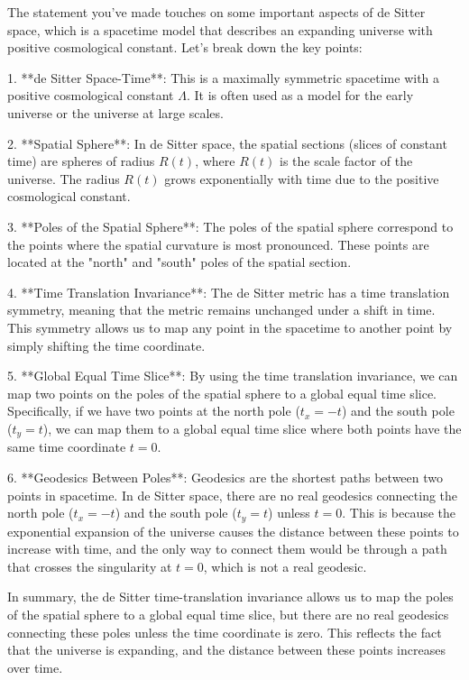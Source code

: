 The statement you've made touches on some important aspects of de Sitter space, which is a spacetime model that describes an expanding universe with positive cosmological constant. Let's break down the key points:

1. **de Sitter Space-Time**: This is a maximally symmetric spacetime with a positive cosmological constant \(\Lambda\). It is often used as a model for the early universe or the universe at large scales.

2. **Spatial Sphere**: In de Sitter space, the spatial sections (slices of constant time) are spheres of radius \(R(t)\), where \(R(t)\) is the scale factor of the universe. The radius \(R(t)\) grows exponentially with time due to the positive cosmological constant.

3. **Poles of the Spatial Sphere**: The poles of the spatial sphere correspond to the points where the spatial curvature is most pronounced. These points are located at the "north" and "south" poles of the spatial section.

4. **Time Translation Invariance**: The de Sitter metric has a time translation symmetry, meaning that the metric remains unchanged under a shift in time. This symmetry allows us to map any point in the spacetime to another point by simply shifting the time coordinate.

5. **Global Equal Time Slice**: By using the time translation invariance, we can map two points on the poles of the spatial sphere to a global equal time slice. Specifically, if we have two points at the north pole (\(t_x = -t\)) and the south pole (\(t_y = t\)), we can map them to a global equal time slice where both points have the same time coordinate \(t = 0\).

6. **Geodesics Between Poles**: Geodesics are the shortest paths between two points in spacetime. In de Sitter space, there are no real geodesics connecting the north pole (\(t_x = -t\)) and the south pole (\(t_y = t\)) unless \(t = 0\). This is because the exponential expansion of the universe causes the distance between these points to increase with time, and the only way to connect them would be through a path that crosses the singularity at \(t = 0\), which is not a real geodesic.

In summary, the de Sitter time-translation invariance allows us to map the poles of the spatial sphere to a global equal time slice, but there are no real geodesics connecting these poles unless the time coordinate is zero. This reflects the fact that the universe is expanding, and the distance between these points increases over time.